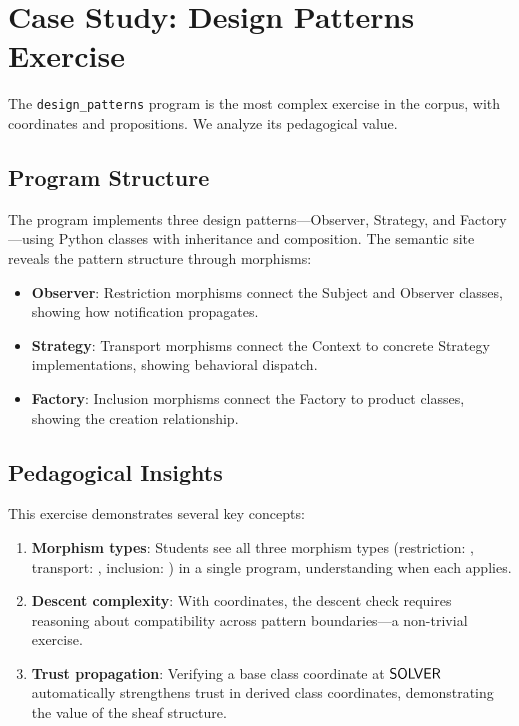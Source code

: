 \documentclass[11pt]{article}
\begin{document}
\section{Case Study: Design Patterns Exercise}\label{sec:case-study}

The \texttt{design\_patterns} program is the most complex exercise in the
corpus, with \ppLXVIedudesignpatternsCoords{} coordinates and
\ppLXVIedudesignpatternsProps{} propositions. We analyze its pedagogical
value.

\subsection{Program Structure}

The program implements three design patterns---Observer, Strategy, and
Factory---using Python classes with inheritance and composition. The
semantic site reveals the pattern structure through morphisms:
\begin{itemize}[leftmargin=*]
  \item \textbf{Observer}: Restriction morphisms connect the Subject and
        Observer classes, showing how notification propagates.
  \item \textbf{Strategy}: Transport morphisms connect the Context to
        concrete Strategy implementations, showing behavioral dispatch.
  \item \textbf{Factory}: Inclusion morphisms connect the Factory to
        product classes, showing the creation relationship.
\end{itemize}

\subsection{Pedagogical Insights}

This exercise demonstrates several key concepts:
\begin{enumerate}[leftmargin=*]
  \item \textbf{Morphism types}: Students see all three morphism types
        (restriction: \compMorphRestrictionPct{}, transport:
        \compMorphTransportPct{}, inclusion: \compMorphInclusionPct{}) in
        a single program, understanding when each applies.
  \item \textbf{Descent complexity}: With \ppLXVIedudesignpatternsCoords{}
        coordinates, the descent check requires reasoning about
        compatibility across pattern boundaries---a non-trivial exercise.
  \item \textbf{Trust propagation}: Verifying a base class coordinate at
        $\mathsf{SOLVER}$ automatically strengthens trust in derived class
        coordinates, demonstrating the value of the sheaf structure.
\end{enumerate}
\end{document}
